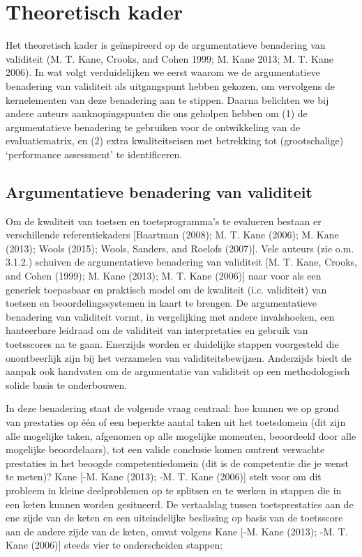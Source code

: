 \documentclass[
  letterpaper,
]{report}
\begin{document}
\hypertarget{theoretisch-kader}{%
\section{Theoretisch kader}\label{theoretisch-kader}}

Het theoretisch kader is geïnspireerd op de argumentatieve benadering
van validiteit (M. T. Kane, Crooks, and Cohen 1999; M. Kane 2013; M. T.
Kane 2006). In wat volgt verduidelijken we eerst waarom we de
argumentatieve benadering van validiteit als uitgangspunt hebben
gekozen, om vervolgens de kernelementen van deze benadering aan te
stippen. Daarna belichten we bij andere auteurs aanknopingspunten die
ons geholpen hebben om (1) de argumentatieve benadering te gebruiken
voor de ontwikkeling van de evaluatiematrix, en (2) extra
kwaliteitseisen met betrekking tot (grootschalige) `performance
assessment' te identificeren.

\hypertarget{argumentatieve-benadering-van-validiteit}{%
\subsection{Argumentatieve benadering van
validiteit}\label{argumentatieve-benadering-van-validiteit}}

Om de kwaliteit van toetsen en toetsprogramma's te evalueren bestaan er
verschillende referentiekaders {[}Baartman (2008); M. T. Kane (2006); M.
Kane (2013); Wools (2015); Wools, Sanders, and Roelofs (2007){]}. Vele
auteurs (zie o.m. 3.1.2.) schuiven de argumentatieve benadering van
validiteit {[}M. T. Kane, Crooks, and Cohen (1999); M. Kane (2013); M.
T. Kane (2006){]} naar voor als een generiek toepasbaar en praktisch
model om de kwaliteit (i.c. validiteit) van toetsen en
beoordelingssystemen in kaart te brengen. De argumentatieve benadering
van validiteit vormt, in vergelijking met andere invalshoeken, een
hanteerbare leidraad om de validiteit van interpretaties en gebruik van
toetsscores na te gaan. Enerzijds worden er duidelijke stappen
voorgesteld die onontbeerlijk zijn bij het verzamelen van
validiteitsbewijzen. Anderzijds biedt de aanpak ook handvaten om de
argumentatie van validiteit op een methodologisch solide basis te
onderbouwen.

In deze benadering staat de volgende vraag centraal: hoe kunnen we op
grond van prestaties op één of een beperkte aantal taken uit het
toetsdomein (dit zijn alle mogelijke taken, afgenomen op alle mogelijke
momenten, beoordeeld door alle mogelijke beoordelaars), tot een valide
conclusie komen omtrent verwachte prestaties in het beoogde
competentiedomein (dit is de competentie die je wenst te meten)? Kane
{[}-M. Kane (2013); -M. T. Kane (2006){]} stelt voor om dit probleem in
kleine deelproblemen op te splitsen en te werken in stappen die in een
keten kunnen worden gesitueerd. De vertaalslag tussen toetsprestaties
aan de ene zijde van de keten en een uiteindelijke beslissing op basis
van de toetsscore aan de andere zijde van de keten, omvat volgens Kane
{[}-M. Kane (2013); -M. T. Kane (2006){]} steeds vier te onderscheiden
stappen:
\end{document}
